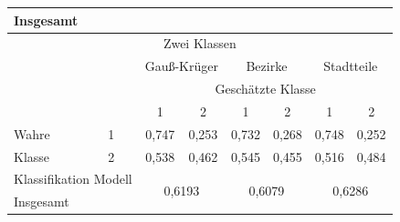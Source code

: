 \documentclass{Vorlage}
\begin{document}
\begin{table}[h]
\begin{tabular}{lcccccccccc}
\multicolumn{2}{l|}{Insgesamt}                                                                    & \multicolumn{3}{c|}{}                        & \multicolumn{3}{c|}{}                        & \multicolumn{3}{c}{}                   \\ \hline
\multicolumn{11}{c}{Zwei Klassen}                                                                                                                                                                                                        \\ \hline
                                                                         & \multicolumn{1}{l|}{}  & \multicolumn{3}{c|}{Gauß-Krüger}             & \multicolumn{3}{c|}{Bezirke}                  & \multicolumn{3}{c}{Stadtteile}         \\ \cline{3-11} 
                                                                         & \multicolumn{1}{l|}{}  & \multicolumn{9}{c}{Geschätzte Klasse}                                                                                                \\
                                                                         & \multicolumn{1}{l|}{}  & 1       & \multicolumn{2}{c|}{2}             & 1       & \multicolumn{2}{c|}{2}             & 1           & \multicolumn{2}{c}{2}    \\ \hline
Wahre                                                                    & \multicolumn{1}{l|}{1} & 0,747   & \multicolumn{2}{c|}{0,253}         & 0,732   & \multicolumn{2}{c|}{0,268}         & 0,748         & \multicolumn{2}{c}{0,252}    \\
Klasse                                                                   & \multicolumn{1}{l|}{2} & 0,538   & \multicolumn{2}{c|}{0,462}         & 0,545   & \multicolumn{2}{c|}{0,455}         & 0,516       & \multicolumn{2}{c}{0,484}    \\ \hline
\multicolumn{2}{l|}{Klassifikation Modell}                                                        & \multicolumn{3}{c|}{\multirow{2}{*}{0,6193}} & \multicolumn{3}{c|}{\multirow{2}{*}{0,6079}} & \multicolumn{3}{c}{\multirow{2}{*}{0,6286}} \\
\multicolumn{2}{l|}{Insgesamt}                                                                    & \multicolumn{3}{c|}{}                        & \multicolumn{3}{c|}{}                        & \multicolumn{3}{c}{}                   \\ \hline \hline
\end{tabular}
\end{table}
\end{document}
